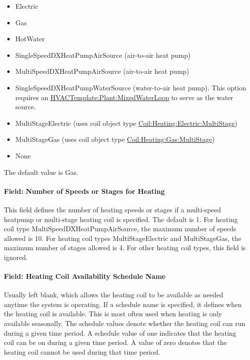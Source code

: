 \begin{itemize}
\item
  Electric
\item
  Gas
\item
  HotWater
\item
  SingleSpeedDXHeatPumpAirSource (air-to-air heat pump)
\item
  MultiSpeedDXHeatPumpAirSource (air-to-air heat pump)
\item
  SingleSpeedDXHeatPumpWaterSource (water-to-air heat pump). This option requires an \hyperref[hvactemplateplantmixedwaterloop]{HVACTemplate:Plant:MixedWaterLoop} to serve as the water source.
\item
  MultiStageElectric (uses coil object type \hyperref[coilheatingelectricmultistage]{Coil:Heating:Electric:MultiStage})
\item
  MultiStageGas (uses coil object type \hyperref[coilheatinggasmultistage]{Coil:Heating:Gas:MultiStage})
\item
  None
\end{itemize}

The default value is Gas.

\paragraph{Field: Number of Speeds or Stages for Heating}\label{field-number-of-speeds-or-stages-for-heating}

This field defines the number of heating speeds or stages if a multi-speed heatpump or multi-stage heating coil is specified. The default is 1. For heating coil type MultiSpeedDXHeatPumpAirSource, the maximum number of speeds allowed is 10. For heating coil types MultiStageElectric and MultiStageGas, the maximum number of stages allowed is 4. For other heating coil types, this field is ignored.

\paragraph{Field: Heating Coil Availability Schedule Name}\label{field-heating-coil-availability-schedule-name-3}

Usually left blank, which allows the heating coil to be available as needed anytime the system is operating. If a schedule name is specified, it defines when the heating coil is available. This is most often used when heating is only available seasonally. The schedule values denote whether the heating coil can run during a given time period. A schedule value of one indicates that the heating coil can be on during a given time period. A value of zero denotes that the heating coil cannot be used during that time period.

